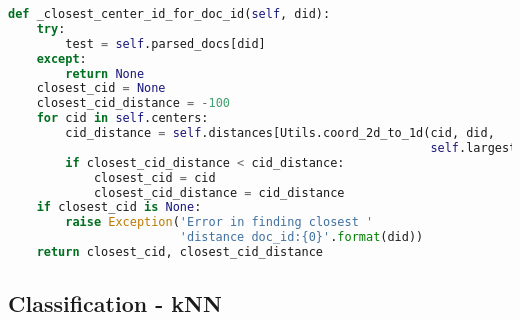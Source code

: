\begin{lstlisting}[language=Python, caption={Clusterization.\_closest\_center\_id\_for\_doc\_id() - Finding closest center for a document during clusterization, part 2}, label={lst:clusterization:centerdoc}]
def _closest_center_id_for_doc_id(self, did):
    try:
        test = self.parsed_docs[did]
    except:
        return None
    closest_cid = None
    closest_cid_distance = -100
    for cid in self.centers:
        cid_distance = self.distances[Utils.coord_2d_to_1d(cid, did,
                                                           self.largest_id)]
        if closest_cid_distance < cid_distance:
            closest_cid = cid
            closest_cid_distance = cid_distance
    if closest_cid is None:
        raise Exception('Error in finding closest '
                        'distance doc_id:{0}'.format(did))
    return closest_cid, closest_cid_distance
\end{lstlisting}

\subsection{Classification - kNN}

